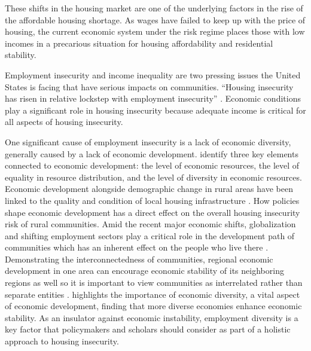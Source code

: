 These shifts in the housing market are one of the underlying factors in the rise of the affordable housing shortage. As wages have failed to keep up with the price of housing, the current economic system under the risk regime places those with low incomes in a precarious situation for housing affordability and residential stability. %

Employment insecurity and income inequality are two pressing issues the United States is facing that have serious impacts on communities. “Housing insecurity has risen in relative lockstep with employment insecurity” \citep[48]{desmond_housing_2016-1}. Economic conditions play a significant role in housing insecurity because adequate income is critical for all aspects of housing insecurity.  

 

 

One significant cause of employment insecurity is a lack of economic diversity, generally caused by a lack of economic development. \citet{sherrieb_measuring_2010} identify three key elements connected to economic development: the level of economic resources, the level of equality in resource distribution, and the level of diversity in economic resources. Economic development alongside demographic change in rural areas have been linked to the quality and condition of local housing infrastructure \citep{barcus_heterogeneity_2011}. How policies shape economic development has a direct effect on the overall housing insecurity risk of rural communities. Amid the recent major economic shifts, globalization and shifting employment sectors play a critical role in the development path of communities which has an inherent effect on the people who live there \citep{harrison_spatial_2019}. Demonstrating the interconnectedness of communities, regional economic development in one area can encourage economic stability of its neighboring regions as well so it is important to view communities as interrelated rather than separate entities \citep{chen_economic_2018}. \citet{deller_spatial_2016} highlights the importance of economic diversity, a vital aspect of economic development, finding that more diverse economies enhance economic stability. As an insulator against economic instability, employment diversity is a key factor that policymakers and scholars should consider as part of a holistic approach to housing insecurity.  

